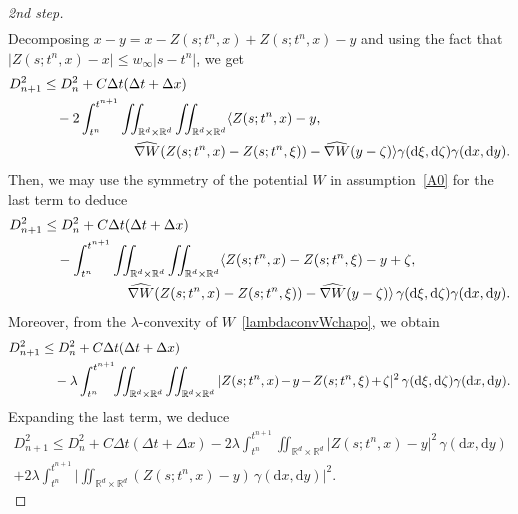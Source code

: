 \documentclass[11pt]{article}
\theoremstyle{definition}
\numberwithin{equation}{section}
\newcommand*{\dd}{\mathrm{d}}
\newcommand*{\dx}{\dd x}
\newcommand*{\dy}{\dd y}
\newcommand*{\dzeta}{\dd \zeta}
\newcommand*{\dxi}{\dd \xi}
\newcommand*\RR{\mathbb{R}}
\newcommand*\nabWchapo{\widehat{\nabla W}}
\newenvironment{step}[1]{\begin{proof}[#1]}{\let\qed\relax \end{proof}}
\newcommand*{\Mk}{\mkern -2mu}
\begin{document}
\begin{step}{2nd step}
\begin{align*}
\end{align*}
Decomposing $x-y=x-Z(s;t^n,x)+Z(s;t^n,x)-y$ and using the fact that $|Z(s;t^n,x)-x|\leq w_\infty |s-t^n|$, we get
\begin{align*}
D_{n+1}^2 &\leq D_n^2 + C \Delta t(\Delta t+\Delta x) \\
&\quad - 2 \int_{t^n}^{t^{n+1}}\iint_{\RR^d\times \RR^d}\iint_{\RR^d\times \RR^d} \langle Z(s;t^n,x)-y, \\
&\mkern 120mu \nabWchapo(Z(s;t^n,x)-Z(s;t^n,\xi))-\nabWchapo(y-\zeta)\rangle \gamma(\dxi,\dzeta) \gamma(\dx,\dy).
\end{align*}
Then, we may use the symmetry of the potential $W$ in assumption~\eqref{A0} for the last term to deduce
\begin{align*}
D_{n+1}^2 & \leq D_n^2 + C \Delta t(\Delta t+\Delta x) \\
&\quad - \int_{t^n}^{t^{n+1}}\iint_{\RR^d\times \RR^d}\iint_{\RR^d\times \RR^d} \langle Z(s;t^n,x)-Z(s;t^n,\xi)-y+\zeta, \\
&\mkern 110mu \nabWchapo(Z(s;t^n,x)-Z(s;t^n,\xi))-\nabWchapo(y-\zeta)\rangle\, \gamma(\dxi,\dzeta) \gamma(\dx,\dy).
\end{align*}
Moreover, from the $\lambda$-convexity of $W$~\eqref{lambdaconvWchapo}, we obtain
\begin{align*}
D_{n+1}^2 &\leq D_n^2 + C \Delta t(\Delta t+\Delta x) \\
& \quad - \lambda \int_{t^n}^{t^{n+1}}\!\!\iint_{\RR^d\times \RR^d}\iint_{\RR^d\times \RR^d} |Z(s;t^n,x)\Mk-\Mk y\Mk-\Mk Z(s;t^n,\xi)\Mk+\Mk\zeta|^2\, \gamma(\dxi,\dzeta) \gamma(\dx,\dy).
\end{align*}
Expanding the last term, we deduce
\begin{multline}
D_{n+1}^2 \leq D_n^2 + C \Delta t(\Delta t+\Delta x) - 2\lambda \int_{t^n}^{t^{n+1}} \iint_{\RR^d\times \RR^d} |Z(s;t^n,x)-y|^2
\,\gamma(\dx,\dy) \\
+ 2\lambda \int_{t^n}^{t^{n+1}} \biggl\vert \iint_{\RR^d\times \RR^d} (Z(s;t^n,x)-y)
\,\gamma(\dx,\dy) \biggr\vert^2. \label{interm2}
\end{multline}
\end{step}
\end{document}
